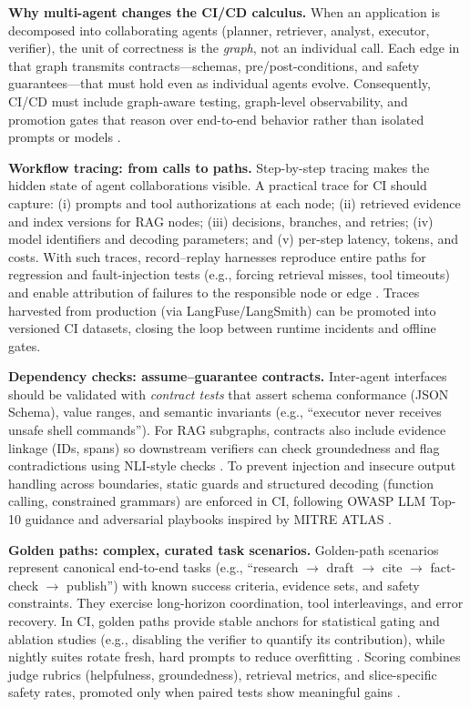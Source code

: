 \noindent\textbf{Why multi-agent changes the CI/CD calculus.}
When an application is decomposed into collaborating agents (planner, retriever, analyst, executor, verifier), the unit of correctness is the \emph{graph}, not an individual call. Each edge in that graph transmits contracts---schemas, pre/post-conditions, and safety guarantees---that must hold even as individual agents evolve. Consequently, CI/CD must include graph-aware testing, graph-level observability, and promotion gates that reason over end-to-end behavior rather than isolated prompts or models \cite{helm,phoenix_rag}.

\noindent\textbf{Workflow tracing: from calls to paths.}
Step-by-step tracing makes the hidden state of agent collaborations visible. A practical trace for CI should capture: (i) prompts and tool authorizations at each node; (ii) retrieved evidence and index versions for RAG nodes; (iii) decisions, branches, and retries; (iv) model identifiers and decoding parameters; and (v) per-step latency, tokens, and costs. With such traces, record--replay harnesses reproduce entire paths for regression and fault-injection tests (e.g., forcing retrieval misses, tool timeouts) and enable attribution of failures to the responsible node or edge \cite{phoenix_rag,trulens}. Traces harvested from production (via LangFuse/LangSmith) can be promoted into versioned CI datasets, closing the loop between runtime incidents and offline gates.

\noindent\textbf{Dependency checks: assume--guarantee contracts.}
Inter-agent interfaces should be validated with \emph{contract tests} that assert schema conformance (JSON Schema), value ranges, and semantic invariants (e.g., ``executor never receives unsafe shell commands''). For RAG subgraphs, contracts also include evidence linkage (IDs, spans) so downstream verifiers can check groundedness and flag contradictions using NLI-style checks \cite{ragas_eacl2024,phoenix_rag}. To prevent injection and insecure output handling across boundaries, static guards and structured decoding (function calling, constrained grammars) are enforced in CI, following OWASP LLM Top-10 guidance and adversarial playbooks inspired by MITRE ATLAS \cite{owasp_llm}.

\noindent\textbf{Golden paths: complex, curated task scenarios.}
Golden-path scenarios represent canonical end-to-end tasks (e.g., ``research $\rightarrow$ draft $\rightarrow$ cite $\rightarrow$ fact-check $\rightarrow$ publish'') with known success criteria, evidence sets, and safety constraints. They exercise long-horizon coordination, tool interleavings, and error recovery. In CI, golden paths provide stable anchors for statistical gating and ablation studies (e.g., disabling the verifier to quantify its contribution), while nightly suites rotate fresh, hard prompts to reduce overfitting \cite{helm}. Scoring combines judge rubrics (helpfulness, groundedness), retrieval metrics, and slice-specific safety rates, promoted only when paired tests show meaningful gains \cite{koehn2004,mcnemar1947}.

